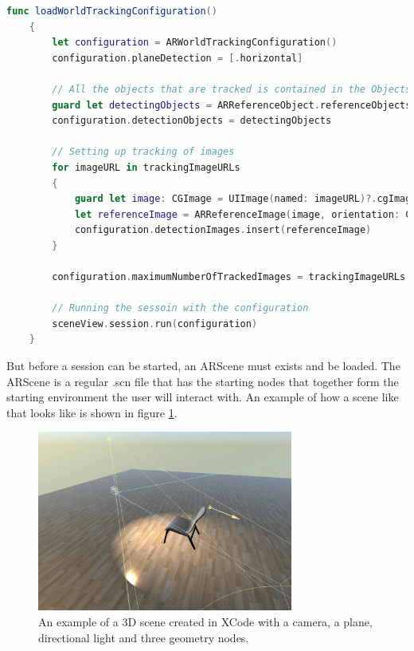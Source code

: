 \begin{lstlisting}[language=swift]
func loadWorldTrackingConfiguration()
    {
        let configuration = ARWorldTrackingConfiguration()
        configuration.planeDetection = [.horizontal]

        // All the objects that are tracked is contained in the Objects folder
        guard let detectingObjects = ARReferenceObject.referenceObjects(inGroupNamed: "Objects", bundle: nil) else { return }
        configuration.detectionObjects = detectingObjects
        
        // Setting up tracking of images
        for imageURL in trackingImageURLs
        {
            guard let image: CGImage = UIImage(named: imageURL)?.cgImage else { return }
            let referenceImage = ARReferenceImage(image, orientation: CGImagePropertyOrientation.up, physicalWidth: 0.3)
            configuration.detectionImages.insert(referenceImage)
        }

        configuration.maximumNumberOfTrackedImages = trackingImageURLs.count
        
        // Running the sessoin with the configuration
        sceneView.session.run(configuration)
    }
\end{lstlisting}

But before a session can be started, an ARScene must exists and be loaded. The ARScene is a regular .scn file that has the starting nodes that together form the starting
environment the user will interact with. An example of how a scene like that looks like is shown in figure \ref{fig:3dsceneImage}.

\begin{figure}[hbtp]
\begin{center}
\includegraphics[width = 0.75\textwidth]{./Images/3dscene.jpg} 
\caption{An example of a 3D scene created in XCode with a camera, a plane, directional light and three geometry nodes.}
\label{fig:3dsceneImage}
\end{center}
\end{figure}

